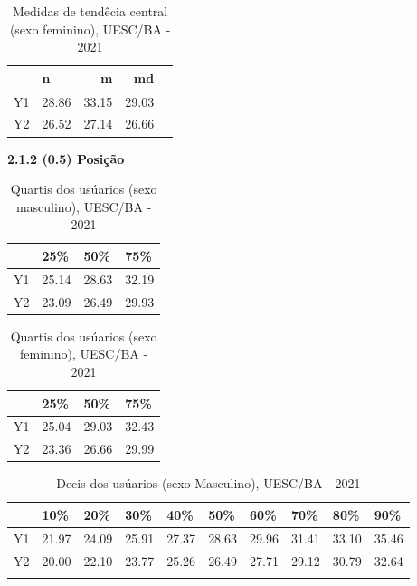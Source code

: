\documentclass[12pt]{article}\usepackage[]{graphicx}\usepackage[]{color}
\begin{document}

\begin{table}[!ht]
  \centering
  \caption{Medidas de tendêcia central (sexo feminino), UESC/BA - 2021}
  \begin{tabular}{rlrrr}
    \toprule   
    & n & m & md \\ 
    \midrule
  Y1 & 28.86 & 33.15 & 29.03 \\ 
  Y2 & 26.52 & 27.14 & 26.66 \\ 
     \bottomrule
  \end{tabular}
\end{table}
\textbf{2.1.2 (0.5) Posição}


\begin{table}[!ht]
  \centering
  \caption{Quartis dos usúarios (sexo masculino), UESC/BA - 2021}
\begin{tabular}{llll}
\hline
   & 25\%  & 50\%  & 75\%  \\ \hline
Y1 & 25.14 & 28.63 & 32.19 \\
Y2 & 23.09 & 26.49 & 29.93 \\ \hline
\end{tabular}
\end{table}

\begin{table}[!ht]
  \centering
  \caption{Quartis dos usúarios (sexo feminino), UESC/BA - 2021}
\begin{tabular}{llll}
\hline
   & 25\%  & 50\%  & 75\%  \\ \hline
Y1 & 25.04 & 29.03 & 32.43 \\
Y2 & 23.36 & 26.66 & 29.99 \\ \hline
\end{tabular}
\end{table}

\begin{table}[!ht]
  \centering
  \caption{Decis dos usúarios (sexo Masculino), UESC/BA - 2021}
\begin{tabular}{llllllllll}
\hline
   & 10\%  & 20\%  & 30\%  & 40\%  & 50\%  & 60\%  & 70\%  & 80\%  & 90\%  \\ \hline
Y1 & 21.97 & 24.09 & 25.91 & 27.37 & 28.63 & 29.96 & 31.41 & 33.10 & 35.46 \\
Y2 & 20.00 & 22.10 & 23.77 & 25.26 & 26.49 & 27.71 & 29.12 & 30.79 & 32.64 \\ \hline
   &       &       &       &       &       &       &       &       &      
\end{tabular}
 \end{table}
\clearpage
\end{document}
